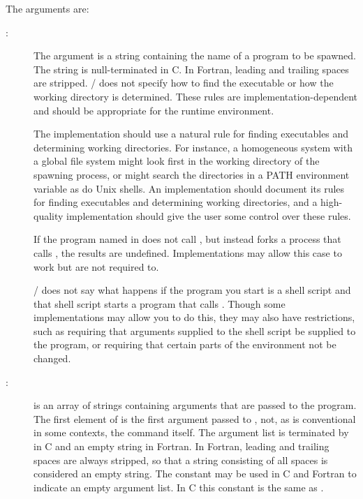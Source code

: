 The arguments are:
\begin{description}
\item[:]
The  argument is a string containing the name of
a program to be spawned. The string is null-terminated in C.
In Fortran, leading and trailing spaces are stripped.
\MPI/ does not specify how to find the executable or how the working
directory is determined. These rules are implementation-dependent
and should be appropriate for the runtime environment.

\begin{implementors}
The implementation should use a natural rule for finding
executables and determining working directories.  For instance, a
homogeneous system with a global file system might look first in the
working directory of the spawning process, or might search the
directories in a PATH environment variable as do Unix shells.
An implementation
should document its rules for finding executables and determining
working directories, and a high-quality implementation should give the
user some control over these rules.
\end{implementors}

If the program named in  does not call
, but instead forks a process that calls
, the results are undefined. Implementations
may allow this case to work but are not required to.

\begin{users}
\MPI/ does not say what happens if the program you start is
a shell script and that shell script starts a program that
calls . Though some implementations may allow
you to do this, they may also have restrictions, such as requiring
that arguments supplied to the shell script be supplied
to the program, or requiring that certain parts of the environment
not be changed.
\end{users}

\item[:]
 is an array of strings containing
arguments that are passed to the program.
The first element of  is the first argument
passed to , not, as is conventional in
some contexts, the command itself. The argument list is terminated
by  in C and an empty string
in Fortran. In Fortran,
leading and trailing spaces are always stripped, so that a string consisting
of all spaces is considered an empty string.
The constant  may be used in C and
Fortran to indicate an empty argument list. In C this constant is the same as
.




\end{description}
